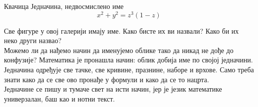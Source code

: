 \begin{surferPage}{Квачица}
Једначина, недвосмислено име \\
\smallskip
\[x^2 + y^2	= z^3	(1 - z) \]


\singlespacing
Све фигуре у овој галерији имају име. Како бисте их ви назвали? Како би их неко други назвао?\\
\vspace{0.3cm}
Можемо ли да нађемо начин да именујемо облике тако да никад не дође до конфузије? Математика је пронашла начин: облик добија име по својој једначини. Једначина одређује све тачке, све кривине, празнине, наборе и врхове. Само треба знати како да се све ово пронађе у формули и како да се то нацрта.\\
\vspace{0.3cm}
Једначине се пишу и тумаче свет на исти начин, јер је језик математике универзалан, баш као и нотни текст.
\end{surferPage}
